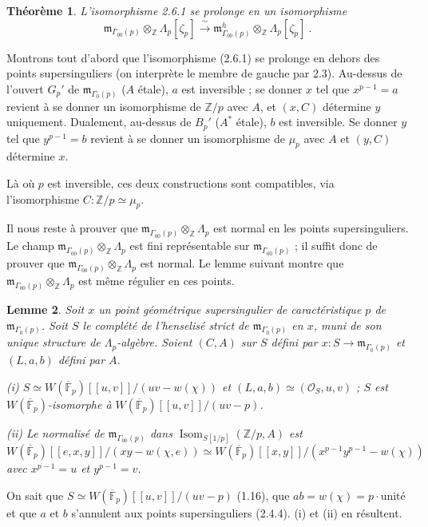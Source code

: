 \documentclass[10pt,a4paper]{amsart}
\theoremstyle{plain}
\newtheorem{theorem}{Th\'eor\`eme}[section]
\newtheorem{lemma}[theorem]{Lemme}
\theoremstyle{definition}
\DeclareMathOperator{\Isom}{Isom}
\newcommand{\m}{\mathfrak{m}}
\newcommand{\FF}{\mathbb{F}}
\newcommand{\ZZ}{\mathbb{Z}}
\begin{document}
\setcounter{theorem}{6}
\begin{theorem}
L'isomorphisme 2.6.1 se prolonge en un isomorphisme
\[
\m_{\Gamma_{00}(p)} \otimes_\ZZ \Lambda_p[\zeta_p] \xrightarrow{\;\sim\;} \m_{\Gamma_{00}(p)}^h \otimes_\ZZ \Lambda_p[\zeta_p]\ .
\]
\end{theorem}

Montrons tout d'abord que l'isomorphisme (2.6.1) se prolonge en dehors des points supersinguliers (on interpr\`ete le membre de gauche par 2.3). Au-dessus de l'ouvert $G_p'$ de $\m_{\Gamma_0(p)}$ ($A$ \'etale), $a$ est inversible ; se donner $x$ tel que $x^{p-1} = a$ revient \`a se donner un isomorphisme de $\ZZ/p$ avec $A$, et $(x,C)$ d\'etermine $y$ uniquement. Dualement, au-dessus de $B_p'$ ($A^*$ \'etale), $b$ est inversible. Se donner $y$ tel que $y^{p-1} = b$ revient \`a se donner un isomorphisme de $\mu_p$ avec $A$ et $(y,C)$ d\'etermine $x$.

L\`a o\`u $p$ est inversible, ces deux constructions sont compatibles, via l'isomorphisme $C : \ZZ/p \simeq \mu_p$.

Il nous reste \`a prouver que $\m_{\Gamma_{00}(p)} \otimes_\ZZ \Lambda_p$ est normal en les points supersinguliers. Le champ $\m_{\Gamma_{00}(p)} \otimes_\ZZ \Lambda_p$ est fini repr\'esentable sur $\m_{\Gamma_{00}(p)}$ ; il suffit donc de prouver que $\m_{\Gamma_{00}(p)} \otimes_\ZZ \Lambda_p$ est normal. Le lemme suivant montre que $\m_{\Gamma_{00}(p)} \otimes_\ZZ \Lambda_p$ est m\^eme r\'egulier en ces points.

\setcounter{theorem}{7}
\begin{lemma}
Soit $x$ un point g\'eom\'etrique supersingulier de caract\'eristique $p$ de $\m_{\Gamma_0(p)}$. Soit $S$ le compl\'et\'e de l'henselis\'e strict de $\m_{\Gamma_0(p)}$ en $x$, muni de son unique structure de $\Lambda_p$-alg\`ebre. Soient $(C,A)$ sur $S$ d\'efini par $x : S \to \m_{\Gamma_0(p)}$ et $(L,a,b)$ d\'efini par $A$.

\emph{(i)} $S \simeq W(\overline{\FF}_p)[[u,v]]/(uv - w(\chi))$ et $(L,a,b) \simeq (\mathcal{O}_S, u, v)$ ; $S$ est $W(\overline{\FF}_p)$-isomorphe \`a $W(\overline{\FF}_p)[[u,v]]/(uv-p)$.

\emph{(ii)} Le normalis\'e de $\m_{\Gamma_{00}(p)}$ dans $\Isom_{S[1/p]}(\ZZ/p, A)$ est
\[
W(\overline{\FF}_p)[[e,x,y]]/(xy - w(\chi,e)) \simeq W(\overline{\FF}_p)[[x,y]]/(x^{p-1}y^{p-1} - w(\chi))
\]
avec $x^{p-1} = u$ et $y^{p-1} = v$.
\end{lemma}

On sait que $S \simeq W(\overline{\FF}_p)[[u,v]]/(uv - p)$ (1.16), que $ab = w(\chi) = p \cdot \text{unit\'e}$ et que $a$ et $b$ s'annulent aux points supersinguliers (2.4.4). (i) et (ii) en r\'esultent.
\end{document}
